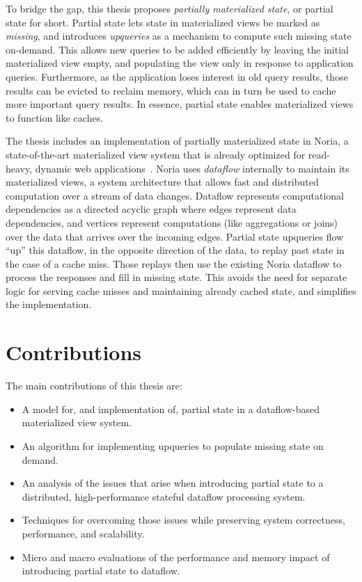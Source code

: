 To bridge the gap, this thesis proposes \textit{partially materialized state},
or partial state for short. Partial state lets state in materialized views be
marked as \textit{missing}, and introduces \textit{upqueries} as a mechanism to
compute such missing state on-demand. This allows new queries to be added
efficiently by leaving the initial materialized view empty, and populating the
view only in response to application queries. Furthermore, as the application
loses interest in old query results, those results can be evicted to reclaim
memory, which can in turn be used to cache more important query results.
In essence, partial state enables materialized views to function like caches.

The thesis includes an implementation of partially materialized state in Noria,
a state-of-the-art materialized view system that is already optimized for
read-heavy, dynamic web applications~\cite{noria}. Noria uses \textit{dataflow}
internally to maintain its materialized views, a system architecture that allows
fast and distributed computation over a stream of data changes. Dataflow
represents computational dependencies as a directed acyclic graph where edges
represent data dependencies, and vertices represent computations (like
aggregations or joins) over the data that arrives over the incoming edges.
Partial state upqueries flow ``up'' this dataflow, in the opposite direction of
the data, to replay past state in the case of a cache miss. Those replays then
use the existing Noria dataflow to process the responses and fill in missing
state. This avoids the need for separate logic for serving cache misses and
maintaining already cached state, and simplifies the implementation.

\section{Contributions}

The main contributions of this thesis are:

\begin{itemize}
 \item A model for, and implementation of, partial state in a dataflow-based
   materialized view system.
 \item An algorithm for implementing upqueries to populate missing state on
   demand.
 \item An analysis of the issues that arise when introducing partial state to a
   distributed, high-performance stateful dataflow processing system.
 \item Techniques for overcoming those issues while preserving system
	 correctness, performance, and scalability.
 \item Micro and macro evaluations of the performance and memory impact of
	 introducing partial state to dataflow.
\end{itemize}


